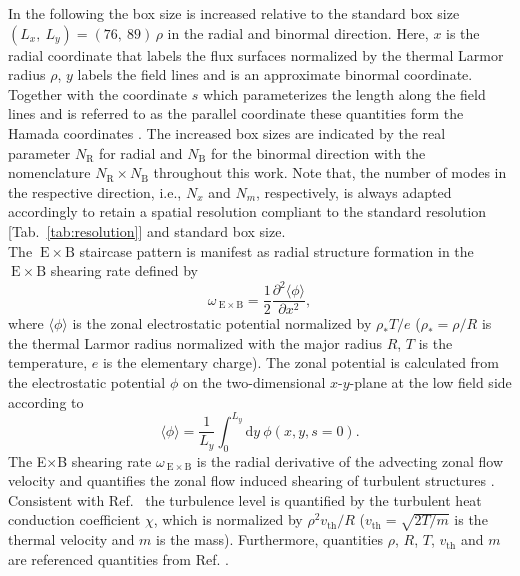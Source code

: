 \documentclass[aip, amsmath, amssymb, reprint, twocolumn, floatfix]{revtex4-1}
\newcommand{\wexb}{\omega_{\mathrm{\:E \times B}}}
\newcommand{\exb}{\mathrm{\:E}\times\mathrm{B}}
\newcommand{\NR}{N_\mathrm{R}}
\newcommand{\NB}{N_\mathrm{B}}
\newcommand{\rhoth}{\rho}
\newcommand{\vth}{v_{\mathrm{th}}}
\newcommand{\xcoord}{x}
\newcommand{\ycoord}{y}
\begin{document}
In the following the box size is increased relative to the standard box size $(L_\xcoord,~L_\ycoord) = (76,~89)\,\rhoth$ in the radial and binormal direction. Here, $\xcoord$ is the radial coordinate that labels the flux surfaces normalized by the thermal Larmor radius $\rhoth$, $\ycoord$ labels the field lines and is an approximate binormal coordinate. Together with the coordinate $s$ which parameterizes the length along the field lines and is referred to as the parallel coordinate these quantities form the Hamada coordinates \cite{Hamada1958}.
The increased box sizes are indicated by the real parameter $\NR$ for radial and $\NB$ for the binormal direction with the nomenclature $\NR\times \NB$ throughout this work.
Note that, the number of modes in the respective direction, i.e., $N_x$ and $N_m$, respectively, is always adapted accordingly to retain a spatial resolution compliant to the standard resolution [Tab.~\ref{tab:resolution}] and standard box size. \\
The $\exb$ staircase pattern is manifest as radial structure formation in the $\exb$ shearing rate defined by\cite{Rath2016, Pueschel2008, Rath2016, Peeters2016}
\begin{equation}
	\wexb = \frac{1}{2} \frac{\partial^2 \langle \phi \rangle}{\partial \xcoord^2},
	\label{eq:shearingrate}
\end{equation}
where $\langle \phi \rangle$ is the zonal electrostatic potential normalized by $\rho_\ast T/e$ ($\rho_\ast = \rhoth/R$ is the thermal Larmor radius normalized with the major radius $R$, $T$ is the temperature, $e$ is the elementary charge).
The zonal potential is calculated from the electrostatic potential $\phi$ on the two-dimensional $\xcoord$-$\ycoord$-plane at the low field side according to\cite{Rath2021}
\begin{equation}
\langle \phi \rangle = \frac{1}{L_\ycoord} \int_0^{L_\ycoord} \mathrm{d}\ycoord ~ \phi(\xcoord,\ycoord,s=0).
\end{equation}
The E$\times$B shearing rate $\wexb$ is the radial derivative of the advecting zonal flow velocity \cite{Hahm1995, Waltz1998} and quantifies the zonal flow induced shearing of turbulent structures \cite{Biglari1990, Hahm1995, Burnell1997}. \\
Consistent with Ref.~ the turbulence level is quantified by the turbulent heat conduction coefficient $\chi$, which is normalized by $\rhoth^2 \vth/R$ ($\vth = \sqrt{2 T/m}$ is the thermal velocity and $m$ is the mass). Furthermore, quantities $\rhoth$, $R$, $T$, $\vth$ and $m$ are referenced quantities from Ref. .
\end{document}
